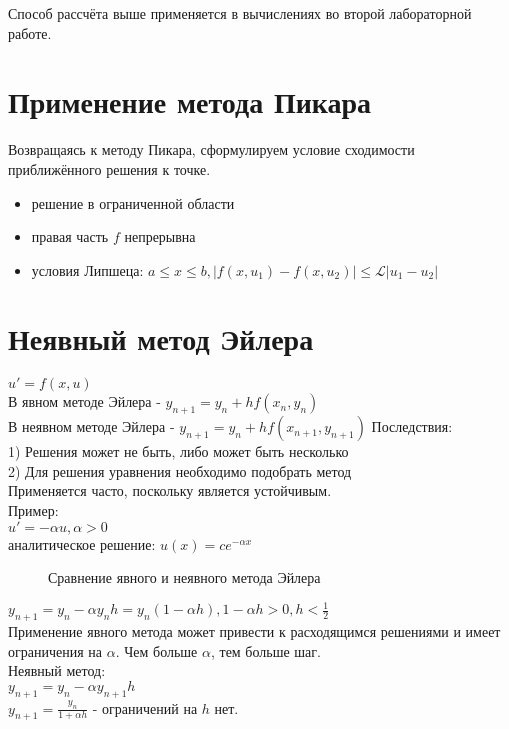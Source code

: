 Способ рассчёта выше применяется в вычислениях во второй лабораторной работе.\\

\section{Применение метода Пикара}
Возвращаясь к методу Пикара, сформулируем условие сходимости приближённого решения к точке.
\begin{itemize}
\item решение в ограниченной области
\item правая часть $f$ непрерывна
\item условия Липшеца: $a \leqslant x \leqslant b, |f(x, u_{1}) - f(x, u_{2})| \leqslant \mathcal{L}|u_{1} - u_{2}|$
\end{itemize}

\section{Неявный метод Эйлера}
$u' = f(x, u)$\\
В явном методе Эйлера - $y_{n+1} = y_{n} + h f(x_{n}, y_{n})$\\
В неявном методе Эйлера - $y_{n+1} = y_{n} + h f (x_{n + 1}, y_{n + 1})$
Последствия:\\
1) Решения может не быть, либо может быть несколько\\
2) Для решения уравнения необходимо подобрать метод\\
Применяется часто, поскольку является устойчивым.\\

Пример:\\
$u' = -\alpha u, \alpha > 0$\\
аналитическое решение: $u(x) = c e^{-\alpha x}$\\
\begin{figure}[H]
	\center{\texttt{[image: a\_1]}}
	\caption{Сравнение явного и неявного метода Эйлера}
\end{figure}

$y_{n+1} = y_{n} - \alpha y_{n} h = y_{n} (1 - \alpha h), 1 - \alpha h > 0, h < \frac{1}{2}$\\
Применение явного метода может привести к расходящимся решениями и имеет ограничения на $\alpha$. Чем больше $\alpha$, тем больше шаг.\\

Неявный метод:\\
$y_{n+1} = y_{n} - \alpha y_{n+1}h$\\
$y_{n+1} = \frac{y_{n}}{1 + \alpha h}$ - ограничений на $h$ нет.\\

